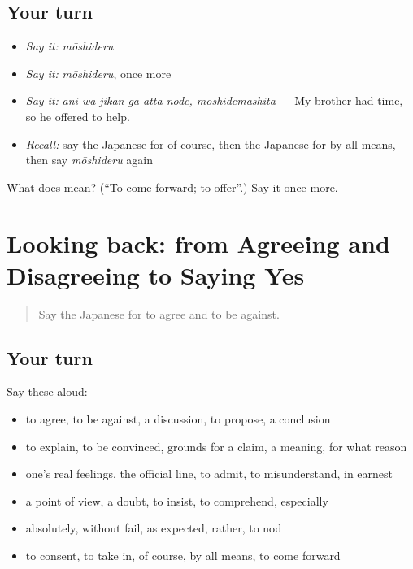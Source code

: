 \subsection*{Your turn}
\begin{itemize}
\raggedright
  \item \emph{Say it:} \emph{mōshideru}
  \item \emph{Say it:} \emph{mōshideru}, once more
  \item \emph{Say it:} \emph{ani wa jikan ga atta node, mōshidemashita} — My brother had time, so he offered to help.
  \item \emph{Recall:} say the Japanese for of course, then the Japanese for by all means, then say \emph{mōshideru} again
\end{itemize}

\begin{tcolorbox}[breakable,colback=teal!4,colframe=teal!35!black,title={Before you move on}]
What does  mean? (\textquotedblleft{}To come forward; to offer\textquotedblright{}.) Say it once more.
\end{tcolorbox}
\section[(dialogue)]{Looking back: from Agreeing and Disagreeing to Saying Yes}

\label{lesson:JA-R322-review-317-322}



\begin{quote}
Say the Japanese for to agree and to be against.
\end{quote}

\subsection*{Your turn}
Say these aloud:

\begin{itemize}
\raggedright
  \item to agree, to be against, a discussion, to propose, a conclusion
  \item to explain, to be convinced, grounds for a claim, a meaning, for what reason
  \item one's real feelings, the official line, to admit, to misunderstand, in earnest
  \item a point of view, a doubt, to insist, to comprehend, especially
  \item absolutely, without fail, as expected, rather, to nod
  \item to consent, to take in, of course, by all means, to come forward
\end{itemize}

